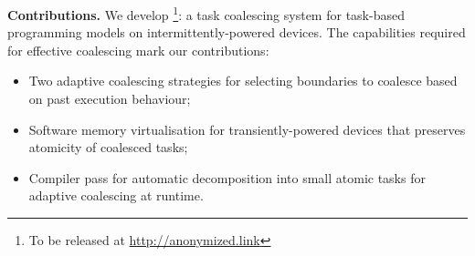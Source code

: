 \textbf{Contributions.} We develop \sys\footnote{To be released at \url{http://anonymized.link}}: a task coalescing system for task-based programming models on intermittently-powered devices. The capabilities required for effective coalescing mark our contributions:

\begin{itemize}
	\item Two adaptive coalescing strategies for selecting boundaries to coalesce based on past execution behaviour;
	\item Software memory virtualisation for transiently-powered devices that preserves atomicity of coalesced tasks;
	\item Compiler pass for automatic decomposition into small atomic tasks for adaptive coalescing at runtime.
\end{itemize}




